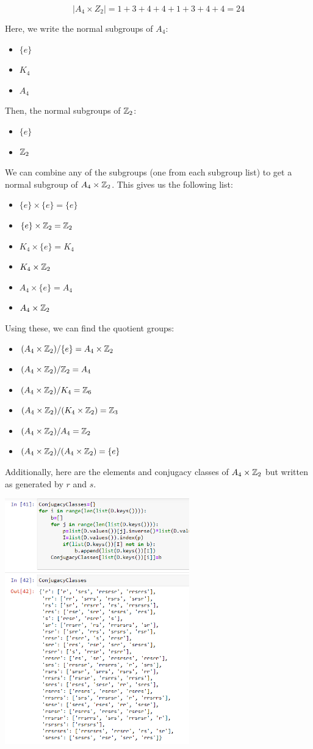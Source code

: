 \documentclass[12pt]{report}
\begin{document}
$$|A_4 \times Z_2| = 1 + 3 + 4 + 4 + 1 + 3 + 4 + 4 = 24$$

Here, we write the normal subgroups of $A_4$:
\begin{itemize}
    \item $\{e\}$
    \item $K_4$
    \item $A_4$
\end{itemize}
Then, the normal subgroups of $\ZZ_2$:
\begin{itemize}
    \item $\{e\}$
    \item $\ZZ_2$
\end{itemize}
We can combine any of the subgroups (one from each subgroup list) to get a normal subgroup of $A_4 \times \ZZ_2$. This gives us the following list:
\begin{itemize}
    \item $\{e\} \times \{e\} = \{e\}$
    \item $\{e\} \times \ZZ_2 = \ZZ_2$
    \item $K_4 \times \{e\} = K_4$
    \item $K_4 \times \ZZ_2$
    \item $A_4 \times \{e\} = A_4$
    \item $A_4 \times \ZZ_2$
\end{itemize}
Using these, we can find the quotient groups:
\begin{itemize}
    \item $(A_4 \times \ZZ_2) / \{e\} = A_4 \times \ZZ_2$
    \item $(A_4 \times \ZZ_2) / \ZZ_2 = A_4 $
    \item $(A_4 \times \ZZ_2) / K_4 = \ZZ_6$
    \item $(A_4 \times \ZZ_2) / (K_4 \times \ZZ_2) = \ZZ_3$
    \item $(A_4 \times \ZZ_2) / A_4 = \ZZ_2$
    \item $(A_4 \times \ZZ_2) / (A_4 \times \ZZ_2) = \{e\}$
\end{itemize}
\newpage
Additionally, here are the elements and conjugacy classes of $A_4 \times \ZZ_2$ but written as generated by $r$ and $s$.

\includegraphics*[width=0.6\textwidth]{conjugacyclasses.png}
\end{document}
